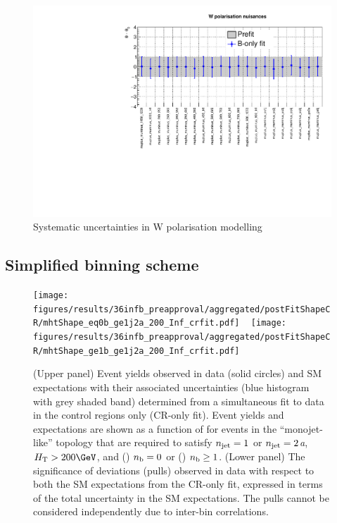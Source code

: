 \clearpage
\begin{figure}[h!]
  \centering
  \caption{Systematic uncertainties in W polarisation modelling}
  \includegraphics[width=0.8\linewidth]{figures/results/36invfb_preapproval/postfit/nuis/WPol_nuisances}
\end{figure}

\clearpage
\subsection{Simplified binning scheme}
\label{app:aggregated}

\newcommand{\customcaption}[5]{(Upper panel) Event yields observed in
  data (solid circles) and SM expectations with their associated
  uncertainties (blue histogram with grey shaded band) determined from
  a simultaneous fit to data in the control regions only (CR-only
  fit). Event yields and expectations are shown as a function of
  \HTmiss for events in the #1 topology that are required to satisfy
  #2, #3, and (\cmsLeft) #4 or (\cmsRight) #5. 
  (Lower panel) The significance of deviations (pulls) observed in
  data with respect to both the SM expectations from the CR-only fit,
  expressed in terms of the total uncertainty in the SM
  expectations. The pulls cannot be considered independently due to
  inter-bin correlations.}

\begin{figure}[h!]
  \centering
  \caption{
    \customcaption{``monojet-like''}{$n_{\text{jet}} = 1$ or $n_{\text{jet}} = 2${\it a}}{$\scalht > 200\GeV$}{$n_{\text{b}} = 0$}{$n_{\text{b}} \geq 1$}
  }
  \texttt{[image: figures/results/36infb\_preapproval/aggregated/postFitShapeCR/mhtShape\_eq0b\_ge1j2a\_200\_Inf\_crfit.pdf]} ~
  \texttt{[image: figures/results/36infb\_preapproval/aggregated/postFitShapeCR/mhtShape\_ge1b\_ge1j2a\_200\_Inf\_crfit.pdf]} 
  \label{fig:aggregated_results1}
\end{figure}

